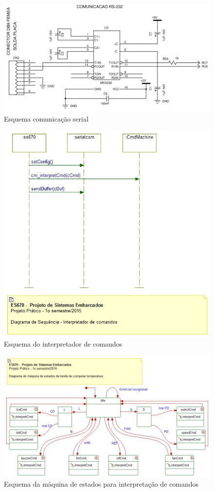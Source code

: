 \documentclass{article}
\begin{document}
\begin{figure}[H]
	\centering
	\includegraphics[width=0.9\linewidth]{serial}
	\caption{Esquema comunicação serial}
	\label{fig:serial}
\end{figure}
\begin{figure}[H]
	\centering
	\includegraphics[width=0.9\linewidth]{interpretador}
	\caption{Esquema do interpretador de comandos}
	\label{fig:interpretador}
\end{figure}
\begin{figure}[H]
	\centering
	\includegraphics[width=0.9\linewidth]{maquina}
	\caption{Esquema da máquina de estados para interpretação de comandos}
	\label{fig:maquina}
\end{figure}
\end{document}

